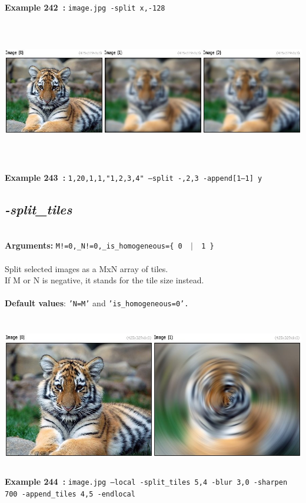 \documentclass[a4paper,11pt,twoside]{book}
\begin{document}
\begin{center}
{\footnotesize \textbf{Example 242~:} \texttt{image.jpg -split x,-128}}
\\\includegraphics[keepaspectratio=true,height=7cm,width=\textwidth]{img/gmic_def243.jpg}\\
{\footnotesize \textbf{Example 243~:} \texttt{1,20,1,1,"1,2,3,4" --split -,2,3 -append[1--1] y}}
\end{center}

\subsection{\emph{-split\_tiles} }\vspace*{-0.5em}
~\\\textbf{Arguments: } 
{\small \texttt{M!=0,\_N!=0,\_is\_homogeneous=\{ 0 ~$|$~ 1 \}}}\\~\\
Split selected images as a MxN array of tiles.
~\\If M or N is negative, it stands for the tile size instead.
~\\~\\\textbf{Default values}: {\small \texttt{'N=M'} and \texttt{'is\_homogeneous=0'.}}
\begin{center}\includegraphics[keepaspectratio=true,height=7cm,width=\textwidth]{img/gmic_def244.jpg}\\
{\footnotesize \textbf{Example 244~:} \texttt{image.jpg --local -split\_tiles 5,4 -blur 3,0 -sharpen 700 -append\_tiles 4,5 -endlocal}}
\end{center}
\end{document}
